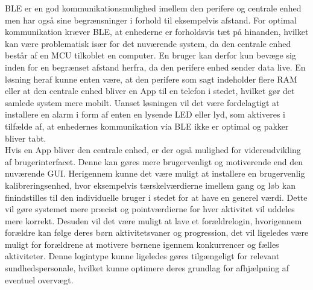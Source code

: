 BLE er en god kommunikationsmulighed imellem den perifere og centrale enhed men har også sine begrænsninger i forhold til eksempelvis afstand. For optimal kommunikation kræver BLE, at enhederne er forholdsvis tæt på hinanden, hvilket kan være problematisk især for det nuværende system, da den centrale enhed består af en MCU tilkoblet en computer. En bruger kan derfor kun bevæge sig inden for en begrænset afstand herfra, da den perifere enhed sender data live. En løsning heraf kunne enten være, at den perifere som sagt indeholder flere RAM eller at den centrale enhed bliver en App til en telefon i stedet, hvilket gør det samlede system mere mobilt. Uanset løsningen vil det være fordelagtigt at installere en alarm i form af enten en lysende LED eller lyd, som aktiveres i tilfælde af, at enhedernes kommunikation via BLE ikke er optimal og pakker bliver tabt. \\
Hvis en App bliver den centrale enhed, er der også mulighed for videreudvikling af brugerinterfacet. Denne kan gøres mere brugervenligt og motiverende end den nuværende GUI. Herigennem kunne det være muligt at installere en brugervenlig kalibreringsenhed, hvor eksempelvis tærskelværdierne imellem gang og løb kan finindstilles til den individuelle bruger i stedet for at have en generel værdi. Dette vil gøre systemet mere præcist og pointværdierne for hver aktivitet vil uddeles mere korrekt. Desuden vil det være muligt at lave et forældrelogin, hvorigennem forældre kan følge deres børn aktivitetsvaner og progression, det vil ligeledes være muligt for forældrene at motivere børnene igennem konkurrencer og fælles aktiviteter. Denne logintype kunne ligeledes gøres tilgængeligt for relevant sundhedspersonale, hvilket kunne optimere deres grundlag for afhjælpning af eventuel overvægt. \\



